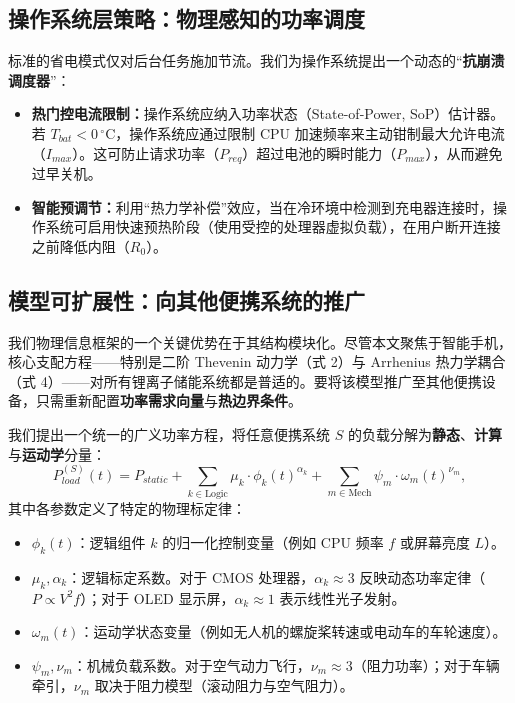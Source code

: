 \documentclass[11pt,a4paper]{ctexart}
\begin{document}
\subsection{操作系统层策略：物理感知的功率调度}

标准的省电模式仅对后台任务施加节流。我们为操作系统提出一个动态的“\textbf{抗崩溃调度器}”：

\begin{itemize}[leftmargin=1.6em,itemsep=0.3em]
\item \textbf{热门控电流限制：}操作系统应纳入功率状态（State-of-Power, SoP）估计器。若 $T_{bat}<0\,^{\circ}\mathrm{C}$，操作系统应通过限制 CPU 加速频率来主动钳制最大允许电流（$I_{max}$）。这可防止请求功率（$P_{req}$）超过电池的瞬时能力（$P_{max}$），从而避免过早关机。
\item \textbf{智能预调节：}利用“热力学补偿”效应，当在冷环境中检测到充电器连接时，操作系统可启用快速预热阶段（使用受控的处理器虚拟负载），在用户断开连接之前降低内阻（$R_0$）。
\end{itemize}

\subsection{模型可扩展性：向其他便携系统的推广}

我们物理信息框架的一个关键优势在于其结构模块化。尽管本文聚焦于智能手机，核心支配方程——特别是二阶 Thevenin 动力学（式 2）与 Arrhenius 热力学耦合（式 4）——对所有锂离子储能系统都是普适的。要将该模型推广至其他便携设备，只需重新配置\textbf{功率需求向量}与\textbf{热边界条件}。

我们提出一个统一的广义功率方程，将任意便携系统 $S$ 的负载分解为\textbf{静态}、\textbf{计算}与\textbf{运动学}分量：
\begin{equation}
P_{load}^{(S)}(t)=P_{static}+\sum_{k\in\mathrm{Logic}}\mu_k\cdot\phi_k(t)^{\alpha_k}+\sum_{m\in\mathrm{Mech}}\psi_m\cdot\omega_m(t)^{\nu_m},
\end{equation}
其中各参数定义了特定的物理标定律：

\begin{itemize}[leftmargin=1.6em,itemsep=0.2em]
\item $\phi_k(t)$：逻辑组件 $k$ 的归一化控制变量（例如 CPU 频率 $f$ 或屏幕亮度 $L$）。
\item $\mu_k,\alpha_k$：逻辑标定系数。对于 CMOS 处理器，$\alpha_k\approx 3$ 反映动态功率定律（$P\propto V^2f$）；对于 OLED 显示屏，$\alpha_k\approx 1$ 表示线性光子发射。
\item $\omega_m(t)$：运动学状态变量（例如无人机的螺旋桨转速或电动车的车轮速度）。
\item $\psi_m,\nu_m$：机械负载系数。对于空气动力飞行，$\nu_m\approx 3$（阻力功率）；对于车辆牵引，$\nu_m$ 取决于阻力模型（滚动阻力与空气阻力）。
\end{itemize}
\end{document}
